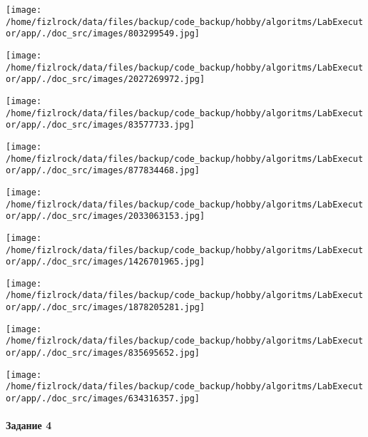 \documentclass[a4paper, 12pt]{article}
\begin{document}
\texttt{[image: /home/fizlrock/data/files/backup/code\_backup/hobby/algoritms/LabExecutor/app/./doc\_src/images/803299549.jpg]}

\texttt{[image: /home/fizlrock/data/files/backup/code\_backup/hobby/algoritms/LabExecutor/app/./doc\_src/images/2027269972.jpg]}

\texttt{[image: /home/fizlrock/data/files/backup/code\_backup/hobby/algoritms/LabExecutor/app/./doc\_src/images/83577733.jpg]}

\texttt{[image: /home/fizlrock/data/files/backup/code\_backup/hobby/algoritms/LabExecutor/app/./doc\_src/images/877834468.jpg]}

\texttt{[image: /home/fizlrock/data/files/backup/code\_backup/hobby/algoritms/LabExecutor/app/./doc\_src/images/2033063153.jpg]}

\texttt{[image: /home/fizlrock/data/files/backup/code\_backup/hobby/algoritms/LabExecutor/app/./doc\_src/images/1426701965.jpg]}

\texttt{[image: /home/fizlrock/data/files/backup/code\_backup/hobby/algoritms/LabExecutor/app/./doc\_src/images/1878205281.jpg]}

\texttt{[image: /home/fizlrock/data/files/backup/code\_backup/hobby/algoritms/LabExecutor/app/./doc\_src/images/835695652.jpg]}

\texttt{[image: /home/fizlrock/data/files/backup/code\_backup/hobby/algoritms/LabExecutor/app/./doc\_src/images/634316357.jpg]}
\pagebreak
\paragraph{Задание 4}
\end{document}
